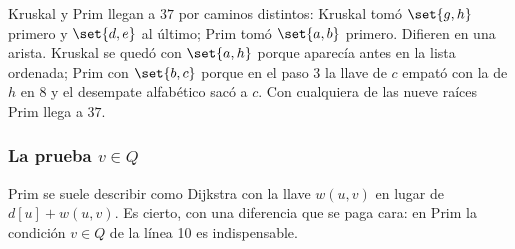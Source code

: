 \documentclass[11pt,letterpaper]{article}
\begin{document}
\begin{ejemplo}
\begin{center}
  \end{center}
  Kruskal y Prim llegan a $37$ por caminos distintos: Kruskal tomó
  $\set{g,h}$ primero y $\set{d,e}$ al último; Prim tomó $\set{a,b}$
  primero. Difieren en una arista. Kruskal se quedó con $\set{a,h}$
  porque aparecía antes en la lista ordenada; Prim con $\set{b,c}$
  porque en el paso 3 la llave de $c$ empató con la de $h$ en $8$ y
  el desempate alfabético sacó a $c$. Con cualquiera de las nueve
  raíces Prim llega a $37$.
\end{ejemplo}

\subsubsection*{La prueba $v \in Q$}

Prim se suele describir como Dijkstra con la llave $w(u, v)$ en lugar
de $d[u] + w(u, v)$. Es cierto, con una diferencia que se paga cara:
en Prim la condición $v \in Q$ de la línea 10 es indispensable.
\end{document}
